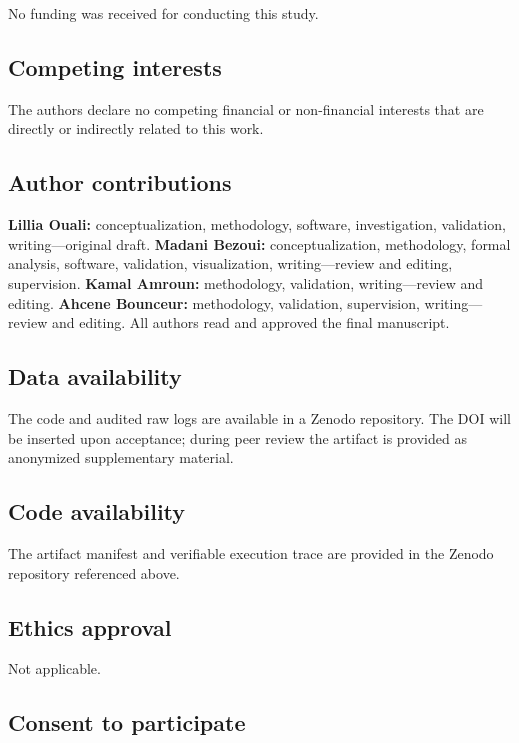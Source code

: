 \documentclass[pdflatex,sn-mathphys-num,iicol,oneside]{sn-jnl}
\begin{document}
No funding was received for conducting this study.

\subsection*{Competing interests}

The authors declare no competing financial or non-financial interests
that are directly or indirectly related to this work.

\subsection*{Author contributions}

\textbf{Lillia Ouali:} conceptualization, methodology, software,
investigation, validation, writing---original draft.
\textbf{Madani Bezoui:} conceptualization, methodology, formal
analysis, software, validation, visualization, writing---review and
editing, supervision.
\textbf{Kamal Amroun:} methodology, validation, writing---review and
editing.
\textbf{Ahcene Bounceur:} methodology, validation, supervision,
writing---review and editing.
All authors read and approved the final manuscript.

\subsection*{Data availability}

The code and audited raw logs are available in a Zenodo repository.
The DOI will be inserted upon acceptance; during peer review the
artifact is provided as anonymized supplementary material.

\subsection*{Code availability}

The artifact manifest and verifiable execution trace are provided in
the Zenodo repository referenced above.

\subsection*{Ethics approval}

Not applicable.

\subsection*{Consent to participate}
\end{document}
